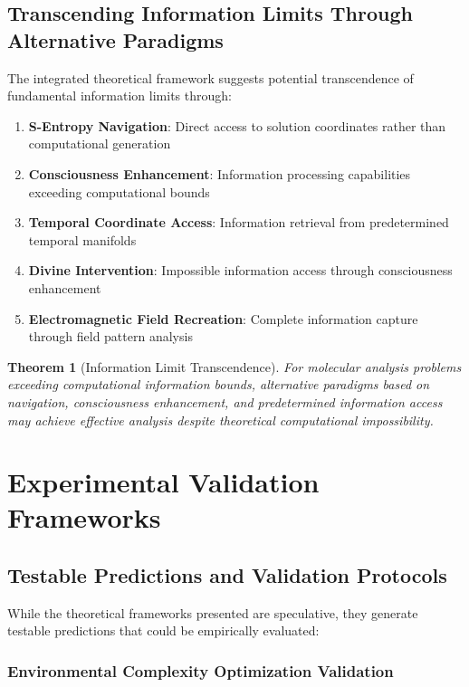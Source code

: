 \documentclass[11pt,a4paper]{article}
\newtheorem{theorem}{Theorem}[section]
\theoremstyle{remark}
\begin{document}
{{{{{{{{{{\subsection{Transcending Information Limits Through Alternative Paradigms}

The integrated theoretical framework suggests potential transcendence of fundamental information limits through:

\begin{enumerate}
\item \textbf{S-Entropy Navigation}: Direct access to solution coordinates rather than computational generation
\item \textbf{Consciousness Enhancement}: Information processing capabilities exceeding computational bounds
\item \textbf{Temporal Coordinate Access}: Information retrieval from predetermined temporal manifolds
\item \textbf{Divine Intervention}: Impossible information access through consciousness enhancement
\item \textbf{Electromagnetic Field Recreation}: Complete information capture through field pattern analysis
\end{enumerate}

\begin{theorem}[Information Limit Transcendence]
For molecular analysis problems exceeding computational information bounds, alternative paradigms based on navigation, consciousness enhancement, and predetermined information access may achieve effective analysis despite theoretical computational impossibility.
\end{theorem}

\section{Experimental Validation Frameworks}

\subsection{Testable Predictions and Validation Protocols}

While the theoretical frameworks presented are speculative, they generate testable predictions that could be empirically evaluated:

\subsubsection{Environmental Complexity Optimization Validation}

}}}}}}}}}}
\end{document}
